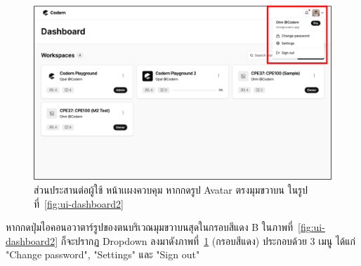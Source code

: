\documentclass[12pt,oneside,openright,a4paper]{cpe-thai-project}
\begin{document}
    \hypertarget{ui-dashboard5}{
        \begin{figure}[H]
        \centering
            \includegraphics[width=15cm]{figure/ui/ui-dashboard5.png}
            \caption[ส่วนประสานต่อผู้ใช้ หน้าเเผงควบคุม (5)]{ส่วนประสานต่อผู้ใช้ หน้าเเผงควบคุม หากกดรูป Avatar ตรงมุมขวาบน ในรูปที่~\ref{fig:ui-dashboard2}}
            \label{fig:ui-dashboard5}
        \end{figure}
    }
    \begin{flushleft}
    หากกดปุ่มไอคอนอวาตาร์รูปของตนบริเวณมุมขวาบนสุดในกรอบสีแดง B ในภาพที่~\ref{fig:ui-dashboard2} ก็จะปรากฏ Dropdown ลงมาดังภาพที่~\ref{fig:ui-dashboard5} (กรอบสีแดง) ประกอบด้วย 3 เมนู ได้แก่ "Change password", "Settings" และ "Sign out"
    \end{flushleft}
\end{document}
